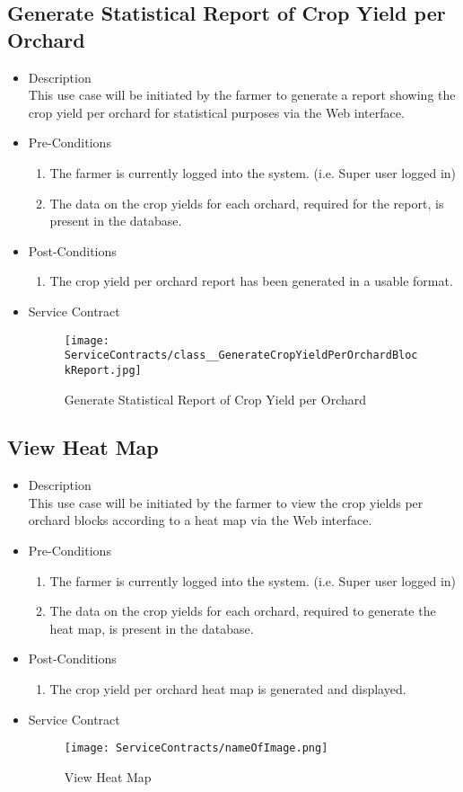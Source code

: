 \documentclass[11pt,fleqn]{book} %
\begin{document}
\subsection{Generate Statistical Report of Crop Yield per Orchard}
\begin{itemize}
	\item Description\\
	This use case will be initiated by the farmer to generate a report showing the crop yield per orchard for statistical purposes via the Web interface.
	\item Pre-Conditions
	\begin{enumerate}
		\item The farmer is currently logged into the system. (i.e. Super user logged in)
		\item The data on the crop yields for each orchard, required for the report, is present in the database.									
	\end{enumerate}
	\item Post-Conditions
	\begin{enumerate}
		\item The crop yield per orchard report has been generated in a usable format.
	\end{enumerate}
	\item Service Contract
	\begin{figure}
		\texttt{[image: ServiceContracts/class\_\_GenerateCropYieldPerOrchardBlockReport.jpg]}
		\caption{Generate Statistical Report of Crop Yield per Orchard}
	\end{figure}
\end{itemize}

\subsection{View Heat Map}
\begin{itemize}
	\item Description\\
	This use case will be initiated by the farmer to view the crop yields per orchard blocks according to a heat map via the Web interface.
	\item Pre-Conditions
	\begin{enumerate}
		\item The farmer is currently logged into the system. (i.e. Super user logged in)
		\item The data on the crop yields for each orchard, required to generate the heat map, is present in the database.	
	\end{enumerate}
	\item Post-Conditions
	\begin{enumerate}
		\item The crop yield per orchard heat map is generated and displayed.
	\end{enumerate}
	\item Service Contract
	\begin{figure}
		\texttt{[image: ServiceContracts/nameOfImage.png]}
		\caption{View Heat Map}
	\end{figure}
\end{itemize}
\end{document}

